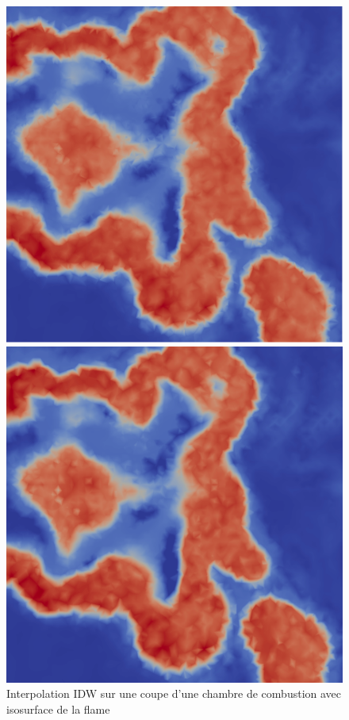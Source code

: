 \begin{figure}[H]
    \centering
    \begin{minipage}[b]{0.47\textwidth}
        \centering
        \includegraphics[width=\textwidth]{images/cb_IDW2.png} %
        \caption{Interpolation IDW sur une coupe d'une chambre de combustion avec isosurface de la flame}
        \label{fig:cb-IDW}
    \end{minipage}
    \hspace{0.02\textwidth} %
    \begin{minipage}[b]{0.47\textwidth}
        \centering
        \includegraphics[width=\textwidth]{images/cb_lineaire2.png} %

\end{minipage}
\end{figure}
